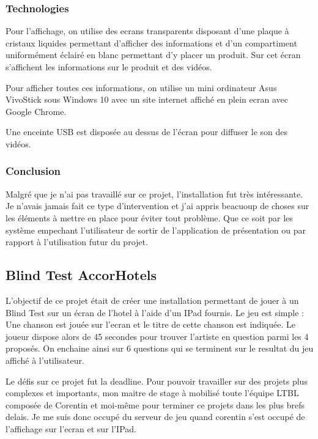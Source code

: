 \documentclass{article}
\begin{document}
\subsubsection{Technologies}

Pour l'affichage, on utilise des ecrans transparents disposant d'une plaque à cristaux liquides permettant d'afficher des informations et d'un compartiment uniformément éclairé en blanc permettant d'y placer un produit.
Sur cet écran s'affichent les informations sur le produit et des vidéos.

Pour afficher toutes ces informations, on utilise un mini ordinateur Asus VivoStick sous Windows 10 avec un site internet affiché en plein ecran avec Google Chrome.

Une enceinte USB est disposée au dessus de l'écran pour diffuser le son des vidéos.

\subsubsection{Conclusion}

Malgré que je n'ai pas travaillé sur ce projet, l'installation fut très intéressante.
Je n'avais jamais fait ce type d'intervention et j'ai appris beacuoup de choses sur les éléments à mettre en place pour éviter tout problème.
Que ce soit par les système empechant l'utilisateur de sortir de l'application de présentation ou par rapport à l'utilisation futur du projet.

\subsection{Blind Test AccorHotels}

L'objectif de ce projet était de créer une installation permettant de jouer à un Blind Test sur un écran de l'hotel à l'aide d'un IPad fournis.
Le jeu est simple : Une chanson est jouée sur l'ecran et le titre de cette chanson est indiquée.
Le joueur dispose alors de 45 secondes pour trouver l'artiste en question parmi les 4 proposés.
On enchaine ainsi sur 6 questions qui se terminent sur le resultat du jeu affiché à l'utilisateur.

Le défis sur ce projet fut la deadline.
Pour pouvoir travailler sur des projets plus complexes et importants, mon maitre de stage à mobilisé toute l'équipe LTBL composée de Corentin et moi-même pour terminer ce projets dans les plus brefs delais.
Je me suis donc occupé du serveur de jeu quand corentin s'est occupé de l'affichage sur l'ecran et sur l'IPad.
\end{document}
